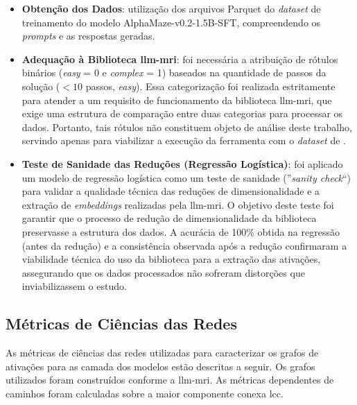 \begin{itemize}
    \item \textbf{Obtenção dos Dados}: utilização dos arquivos Parquet do \textit{dataset} de treinamento do modelo AlphaMaze-v0.2-1.5B-SFT, compreendendo os \textit{prompts} e as respostas geradas.
    
    \item \textbf{Adequação à Biblioteca \gls{llm-mri}}: foi necessária a atribuição de rótulos binários (\textit{easy} = 0 e \textit{complex} = 1) baseados na quantidade de passos da solução ($<10$ passos, \textit{easy}). Essa categorização foi realizada estritamente para atender a um requisito de funcionamento da biblioteca \gls{llm-mri}, que exige uma estrutura de comparação entre duas categorias para processar os dados. Portanto, tais rótulos não constituem objeto de análise deste trabalho, servindo apenas para viabilizar a execução da ferramenta com o \textit{dataset} de \citet{dao2025alphamaze}.

    \item \textbf{Teste de Sanidade das Reduções (Regressão Logística)}: foi aplicado um modelo de regressão logística como um teste de sanidade (''\textit{sanity check}``) para validar a qualidade técnica das reduções de dimensionalidade e a extração de \textit{embeddings} realizadas pela \gls{llm-mri}. O objetivo deste teste foi garantir que o processo de redução de dimensionalidade da biblioteca preservasse a estrutura dos dados. A acurácia de 100\% obtida na regressão (antes da redução) e a consistência observada após a redução confirmaram a viabilidade técnica do uso da biblioteca para a extração das ativações, assegurando que os dados processados não sofreram distorções que inviabilizassem o estudo.
\end{itemize}

\subsection{Métricas de Ciências das Redes}\label{sec:metodologia-metricas}

As métricas de ciências das redes utilizadas para caracterizar os grafos de ativações para as camada dos modelos estão descritas a seguir. Os grafos utilizados foram construídos conforme a \gls{llm-mri}. As métricas dependentes de caminhos foram calculadas sobre a maior componente conexa \gls{lcc}.

